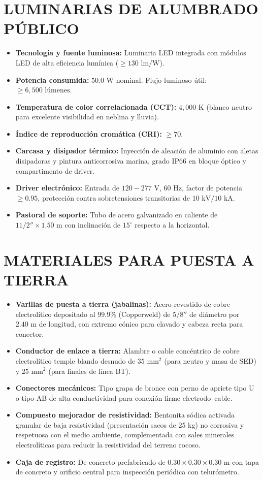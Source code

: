 \section{LUMINARIAS DE ALUMBRADO PÚBLICO}

\begin{itemize}
  \item \textbf{Tecnología y fuente luminosa:} Luminaria LED integrada con módulos LED de alta eficiencia lumínica ($\ge 130\text{ lm/W}$).
  \item \textbf{Potencia consumida:} $50.0\text{ W}$ nominal. Flujo luminoso útil: $\ge 6,500\text{ lúmenes}$.
  \item \textbf{Temperatura de color correlacionada (CCT):} $4,000\text{ K}$ (blanco neutro para excelente visibilidad en neblina y lluvia).
  \item \textbf{Índice de reproducción cromática (CRI):} $\ge 70$.
  \item \textbf{Carcasa y disipador térmico:} Inyección de aleación de aluminio con aletas disipadoras y pintura anticorrosiva marina, grado IP66 en bloque óptico y compartimento de driver.
  \item \textbf{Driver electrónico:} Entrada de $120 - 277\text{ V}$, $60\text{ Hz}$, factor de potencia $\ge 0.95$, protección contra sobretensiones transitorias de $10\text{ kV} / 10\text{ kA}$.
  \item \textbf{Pastoral de soporte:} Tubo de acero galvanizado en caliente de $1 1/2'' \times 1.50\text{ m}$ con inclinación de $15^\circ$ respecto a la horizontal.
\end{itemize}

\section{MATERIALES PARA PUESTA A TIERRA}

\begin{itemize}
  \item \textbf{Varillas de puesta a tierra (jabalinas):} Acero revestido de cobre electrolítico depositado al $99.9\%$ (Copperweld) de $5/8''$ de diámetro por $2.40\text{ m}$ de longitud, con extremo cónico para clavado y cabeza recta para conector.
  \item \textbf{Conductor de enlace a tierra:} Alambre o cable concéntrico de cobre electrolítico temple blando desnudo de $35\text{ mm}^2$ (para neutro y masa de SED) y $25\text{ mm}^2$ (para finales de línea BT).
  \item \textbf{Conectores mecánicos:} Tipo grapa de bronce con perno de apriete tipo U o tipo AB de alta conductividad para conexión firme electrodo--cable.
  \item \textbf{Compuesto mejorador de resistividad:} Bentonita sódica activada granular de baja resistividad (presentación sacos de 25 kg) no corrosiva y respetuosa con el medio ambiente, complementada con sales minerales electrolíticas para reducir la resistividad del terreno rocoso.
  \item \textbf{Caja de registro:} De concreto prefabricado de $0.30 \times 0.30 \times 0.30\text{ m}$ con tapa de concreto y orificio central para inspección periódica con telurómetro.
\end{itemize}

